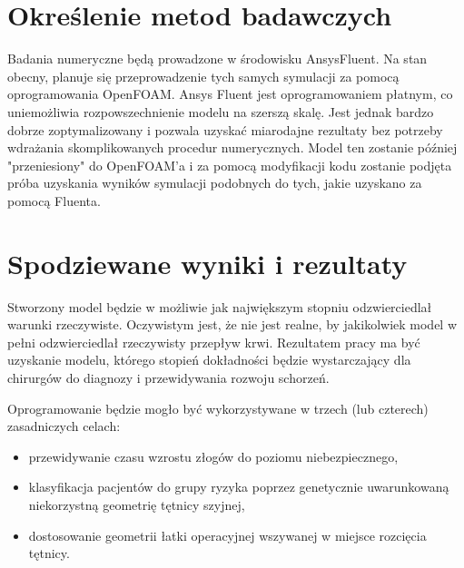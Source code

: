 \documentclass[11pt]{article} %
\begin{document}




\section{Określenie metod badawczych}

Badania numeryczne będą prowadzone w środowisku AnsysFluent. Na stan obecny, planuje się przeprowadzenie tych samych symulacji za pomocą oprogramowania OpenFOAM. Ansys Fluent jest oprogramowaniem płatnym, co uniemożliwia rozpowszechnienie modelu na szerszą skalę. Jest jednak bardzo dobrze zoptymalizowany i pozwala uzyskać miarodajne rezultaty bez potrzeby wdrażania skomplikowanych procedur numerycznych. Model ten zostanie później "przeniesiony" do OpenFOAM’a i za pomocą modyfikacji kodu zostanie podjęta próba uzyskania wyników symulacji podobnych do tych, jakie uzyskano za pomocą Fluenta.


\section{Spodziewane wyniki i rezultaty}

Stworzony model będzie w możliwie jak największym stopniu odzwierciedlał warunki rzeczywiste. Oczywistym jest, że nie jest realne, by jakikolwiek model w pełni odzwierciedlał rzeczywisty przepływ krwi. Rezultatem pracy ma być uzyskanie modelu, którego stopień dokładności będzie wystarczający dla chirurgów do diagnozy i przewidywania rozwoju schorzeń.


Oprogramowanie będzie mogło być wykorzystywane w trzech (lub czterech) zasadniczych celach:
\begin{itemize}
\item przewidywanie czasu wzrostu złogów do poziomu niebezpiecznego,
\item klasyfikacja pacjentów do grupy ryzyka poprzez genetycznie uwarunkowaną niekorzystną geometrię tętnicy szyjnej,
\item dostosowanie geometrii łatki operacyjnej wszywanej w miejsce rozcięcia tętnicy.
\end{itemize}
\end{document}
